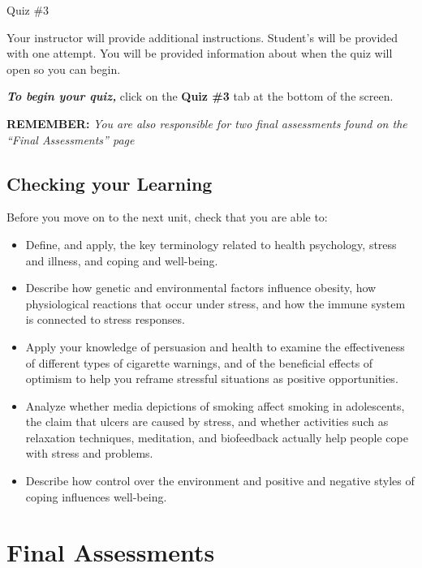 \documentclass[
]{book}
\begin{document}
\begin{assessment}
{Quiz \#3}

Your instructor will provide additional instructions. Student's will be provided with one attempt. You will be provided information about when the quiz will open so you can begin.

\textbf{\emph{To begin your quiz,}} click on the \textbf{Quiz \#3} tab at the bottom of the screen.

\textbf{REMEMBER:} \emph{You are also responsible for two final assessments found on the ``Final Assessments'' page}
\end{assessment}

\hypertarget{checking-your-learning-11}{%
\section*{Checking your Learning}\label{checking-your-learning-11}}

\begin{progress}
Before you move on to the next unit, check that you are able to:

\begin{itemize}
\item
  Define, and apply, the key terminology related to health psychology, stress and illness, and coping and well-being.
\item
  Describe how genetic and environmental factors influence obesity, how physiological reactions that occur under stress, and how the immune system is connected to stress responses.
\item
  Apply your knowledge of persuasion and health to examine the effectiveness of different types of cigarette warnings, and of the beneficial effects of optimism to help you reframe stressful situations as positive opportunities.
\item
  Analyze whether media depictions of smoking affect smoking in adolescents, the claim that ulcers are caused by stress, and whether activities such as relaxation techniques, meditation, and biofeedback actually help people cope with stress and problems.
\item
  Describe how control over the environment and positive and negative styles of coping influences well-being.
\end{itemize}
\end{progress}

\hypertarget{final-assessments}{%
\chapter{Final Assessments}\label{final-assessments}}
\end{document}
